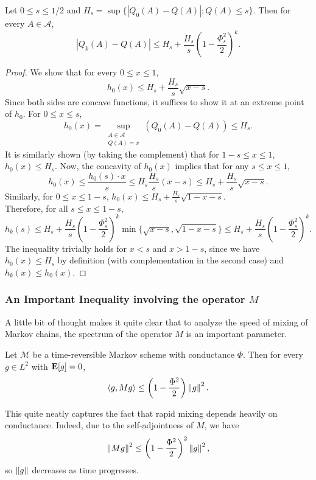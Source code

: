 \begin{corollary}
Let $0\leq s\leq 1/2$ and $H_s=\sup\{|Q_0(A)-Q(A)|:Q(A)\leq s\}$. Then for every $A\in\mathcal{A}$,
\[|Q_k(A)-Q(A)| \leq H_s + \frac{H_s}{s}\left(1-\frac{\Phi_s^2}{2}\right)^k. \]
\end{corollary}
\begin{proof}
We show that for every $0\leq x\leq 1$,
\[ h_0(x) \leq H_s + \frac{H_s}{s}\sqrt{x-s}. \]
Since both sides are concave functions, it suffices to show it at an extreme point of $h_0$. For $0\leq x\leq s$,
\[ h_0(x) = \sup_{\substack{A\in\mathcal{A} \\ Q(A)=x}} (Q_0(A)-Q(A)) \leq H_s. \]
It is similarly shown (by taking the complement) that for $1-s\leq x\leq 1$, $h_0(x) \leq H_s$. Now, the concavity of $h_0(x)$ implies that for any $s\leq x\leq 1$,
\[ h_0(x) \leq \frac{h_0(s)\cdot x}{s} \leq H_s \frac{H_s}{s}(x-s) \leq H_s + \frac{H_s}{s}\sqrt{x-s}. \]
Similarly, for $0\leq x\leq 1-s$, $h_0(x) \leq H_s + \frac{H_s}{s}\sqrt{1-x-s}$.\\
Therefore, for all $s\leq x\leq 1-s$,
\[ h_k(s) \leq H_s + \frac{H_s}{s}\left(1-\frac{\Phi_s^2}{2}\right)^k\min\{\sqrt{x-s},\sqrt{1-x-s}\} \leq H_s + \frac{H_s}{s}\left(1-\frac{\Phi_s^2}{2}\right)^k. \]
The inequality trivially holds for $x<s$ and $x>1-s$, since we have $h_0(x) \leq H_s$ by definition (with complementation in the second case) and $h_k(x) \leq h_0(x)$.
\end{proof}

\subsubsection{An Important Inequality involving the operator \texorpdfstring{$M$}{}}

A little bit of thought makes it quite clear that to analyze the speed of mixing of Markov chains, the spectrum of the operator $M$ is an important parameter.

\begin{ftheo}
Let $\mathcal{M}$ be a time-reversible Markov scheme with conductance $\Phi$. Then for every $g\in L^2$ with $\textbf{E}[g]=0$,
\[ \langle g,Mg\rangle \leq \left(1-\frac{\Phi^2}{2}\right)\left\lVert g\right\rVert^2. \]
\end{ftheo}

This quite neatly captures the fact that rapid mixing depends heavily on conductance. Indeed, due to the self-adjointness of $M$, we have
\[ \left\lVert Mg\right\rVert^2 \leq \left(1-\frac{\Phi^2}{2}\right)^2 \left\lVert g\right\rVert^2,  \]
so $\left\lVert g\right\rVert$ decreases as time progresses.\\

